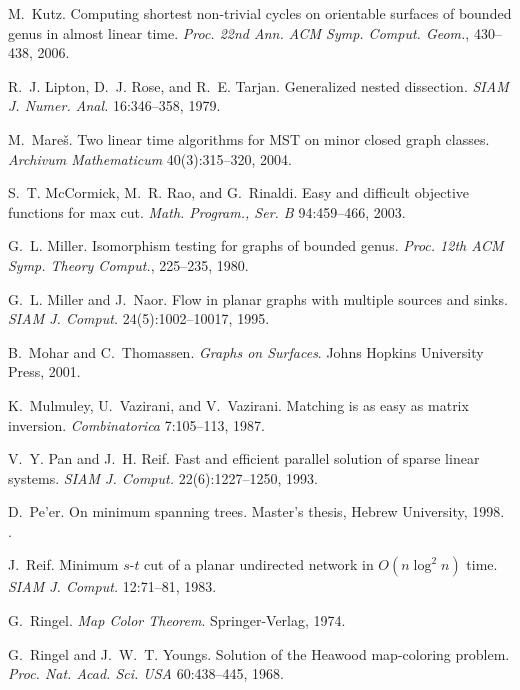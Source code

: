 \documentclass{sig-alternate}
\begin{document}
\begin{thebibliography}{10}
M.~Kutz.
\newblock Computing shortest non-trivial cycles on orientable surfaces of
  bounded genus in almost linear time.
\newblock \emph{Proc. 22nd Ann. ACM Symp. Comput. Geom.}, 430--438, 2006.

R.~J. Lipton, D.~J. Rose, and R.~E. Tarjan.
\newblock Generalized nested dissection.
\newblock \emph{SIAM J. Numer. Anal.} 16:346--358, 1979.

M.~Mare{\v s}.
\newblock Two linear time algorithms for {MST} on minor closed graph classes.
\newblock \emph{Archivum Mathematicum} 40(3):315--320, 2004.

S.~T. McCormick, M.~R. Rao, and G.~Rinaldi.
\newblock Easy and difficult objective functions for max cut.
\newblock \emph{Math. Program., Ser. B} 94:459--466, 2003.

\balancecolumns
\itemsep 1.5pt

G.~L. Miller.
\newblock Isomorphism testing for graphs of bounded genus.
\newblock \emph{Proc. 12th ACM Symp. Theory Comput.}, 225--235, 1980.

G.~L. Miller and J.~Naor.
\newblock Flow in planar graphs with multiple sources and sinks.
\newblock \emph{SIAM J. Comput.} 24(5):1002--10017, 1995.

B.~Mohar and C.~Thomassen.
\newblock \emph{Graphs on Surfaces}.
\newblock Johns Hopkins University Press, 2001.

K.~Mulmuley, U.~Vazirani, and V.~Vazirani.
\newblock Matching is as easy as matrix inversion.
\newblock \emph{Combinatorica} 7:105--113, 1987.

V.~Y. Pan and J.~H. Reif.
\newblock Fast and efficient parallel solution of sparse linear systems.
\newblock \emph{SIAM J. Comput.} 22(6):1227--1250, 1993.

D.~Pe'er.
\newblock On minimum spanning trees.
\newblock Master's thesis, Hebrew University, 1998.
\newblock {}.

J.~Reif.
\newblock Minimum $s$-$t$ cut of a planar undirected network in {$O(n\log^2
  n)$} time.
\newblock \emph{SIAM J. Comput.} 12:71--81, 1983.

G.~Ringel.
\newblock \emph{Map Color Theorem}.
\newblock Springer-Verlag, 1974.

G.~Ringel and J.~W.~T. Youngs.
\newblock Solution of the {Heawood} map-coloring problem.
\newblock \emph{Proc. Nat. Acad. Sci. USA} 60:438--445, 1968.


\end{thebibliography}
\end{document}

